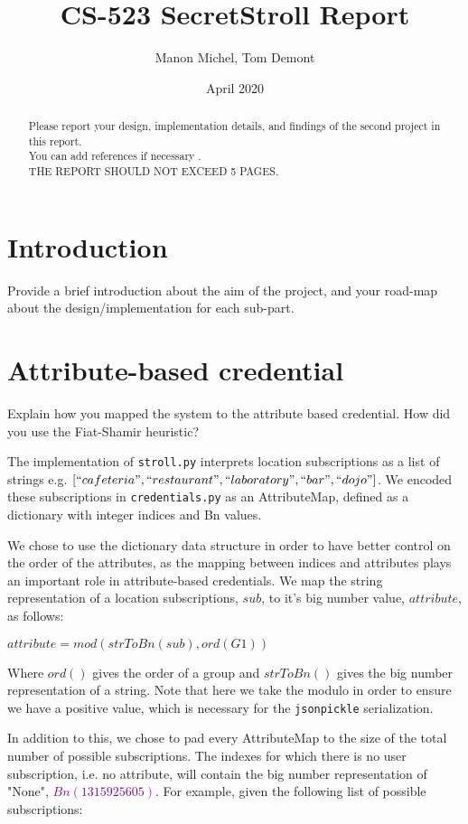\documentclass[10pt,conference,compsocconf]{IEEEtran}
\title{CS-523 SecretStroll Report}
\author{Manon Michel, Tom Demont}
\date{April 2020}
\begin{document}
\maketitle

\begin{abstract}
    Please report your design, implementation details, and findings of the second project in this report. \\
    You can add references if necessary \cite{article}. \\
    THE REPORT SHOULD NOT EXCEED 5 PAGES.
\end{abstract}

\section{Introduction}

Provide a brief introduction about the aim of the project, and your road-map about the design/implementation for each sub-part.

\section{Attribute-based credential}
Explain how you mapped the system to the attribute based credential. How did you
use the Fiat-Shamir heuristic?

The implementation of \texttt{stroll.py} interprets location subscriptions as a list of strings e.g. $[``cafeteria", ``restaurant", ``laboratory", ``bar", ``dojo"]$. 
We encoded these subscriptions in \texttt{credentials.py} as an AttributeMap, defined as a dictionary with integer indices and Bn values. 

We chose to use the dictionary data structure in order to have better control on the order of the attributes, as the mapping between indices and attributes plays an important role in attribute-based credentials. We map the string representation of a location subscriptions, $sub$, to it's big number value, $attribute$, as follows: 

$attribute = mod(strToBn(sub), ord(G1))$

Where $ord()$ gives the order of a group and $strToBn()$ gives the big number representation of a string. Note that here we take the modulo in order to ensure we have a positive value, which is necessary for the \texttt{jsonpickle} serialization. 

In addition to this, we chose to pad every AttributeMap to the size of the total number of possible subscriptions. The indexes for which there is no user subscription, i.e. no attribute, will contain the big number representation of "None", \textcolor{purple}{$Bn(1315925605)$}. For example, given the following list of possible subscriptions: 
\end{document}
